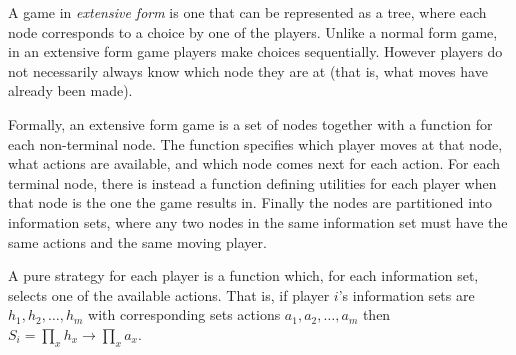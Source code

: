 \documentclass[12pt]{article}
\begin{document}
A game in \emph{extensive form} is one that can be represented as a tree, where each node corresponds to a choice by one of the players.  Unlike a normal form game, in an extensive form game players make choices sequentially.  However players do not necessarily always know which node they are at (that is, what moves have already been made).

Formally, an extensive form game is a set of nodes together with a function for each non-terminal node.  The function specifies which player moves at that node, what actions are available, and which node comes next for each action.  For each terminal node, there is instead a function defining utilities for each player when that node is the one the game results in.  Finally the nodes are partitioned into information sets, where any two nodes in the same information set must have the same actions and the same moving player.

A pure strategy for each player is a function which, for each information set, selects one of the available actions.  That is, if player $i$'s information sets are $h_1,h_2,\ldots,h_m$ with corresponding sets actions $a_1,a_2,\ldots,a_m$ then $S_i=\prod_x h_x\rightarrow \prod_x a_x$.
\end{document}
